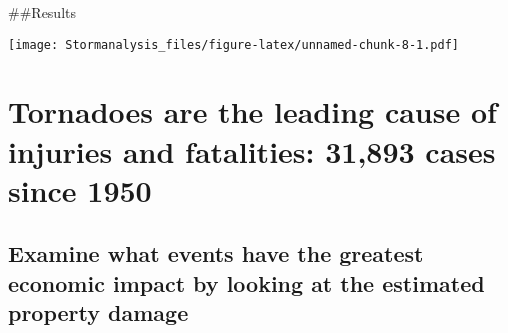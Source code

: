 \documentclass[]{article}
\newenvironment{Shaded}{\begin{snugshade}}{\end{snugshade}}
\newcommand{\DataTypeTok}[1]{\textcolor[rgb]{0.13,0.29,0.53}{#1}}
\newcommand{\DecValTok}[1]{\textcolor[rgb]{0.00,0.00,0.81}{#1}}
\newcommand{\FloatTok}[1]{\textcolor[rgb]{0.00,0.00,0.81}{#1}}
\newcommand{\KeywordTok}[1]{\textcolor[rgb]{0.13,0.29,0.53}{\textbf{#1}}}
\newcommand{\NormalTok}[1]{#1}
\newcommand{\OperatorTok}[1]{\textcolor[rgb]{0.81,0.36,0.00}{\textbf{#1}}}
\newcommand{\OtherTok}[1]{\textcolor[rgb]{0.56,0.35,0.01}{#1}}
\newcommand{\StringTok}[1]{\textcolor[rgb]{0.31,0.60,0.02}{#1}}
\begin{document}
\#\#Results

\begin{Shaded}
\end{Shaded}

\texttt{[image: Stormanalysis\_files/figure-latex/unnamed-chunk-8-1.pdf]}

\hypertarget{tornadoes-are-the-leading-cause-of-injuries-and-fatalities-31893-cases-since-1950}{%
\section{Tornadoes are the leading cause of injuries and fatalities:
31,893 cases since
1950}\label{tornadoes-are-the-leading-cause-of-injuries-and-fatalities-31893-cases-since-1950}}

\hypertarget{examine-what-events-have-the-greatest-economic-impact-by-looking-at-the-estimated-property-damage}{%
\subsection{Examine what events have the greatest economic impact by
looking at the estimated property
damage}\label{examine-what-events-have-the-greatest-economic-impact-by-looking-at-the-estimated-property-damage}}

\begin{Shaded}
\end{Shaded}
\end{document}

